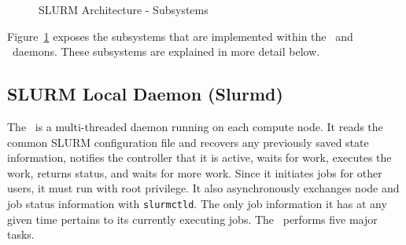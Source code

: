 %

\begin{figure}[tb]
\centerline{}
\caption{SLURM Architecture - Subsystems}
\label{archdetail}
\end{figure}

Figure~\ref{archdetail} exposes the subsystems that are implemented
within the \slurmd\ and \slurmctld\ daemons.  These subsystems
are explained in more detail below.

\subsection{SLURM Local Daemon (Slurmd)}

The \slurmd\ is a multi-threaded daemon running on each compute node.
It reads the common SLURM configuration file and recovers any 
previously saved state information, 
notifies the controller that it is active, waits for work, 
executes the work, returns status, and waits for more work.  
Since it initiates jobs for other users, it must run with root privilege.
It also asynchronously exchanges node and job status information with {\tt slurmctld}.  
The only job information it has at any given time pertains to its 
currently executing jobs.
The \slurmd\ performs five major tasks.

